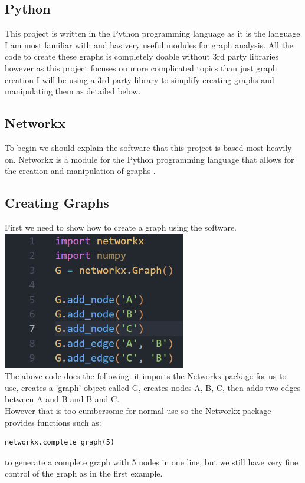 \documentclass{article}
\begin{document}
        \subsection{Python}
        This project is written in the Python programming language as it is the language I am most familiar with and has very useful modules for graph analysis. All the code to create these graphs is completely doable without 3rd party libraries however as this project focuses on more complicated topics than just graph creation I will be using a 3rd party library to simplify creating graphs and manipulating them as detailed below.
        \subsection{Networkx}
        To begin we should explain the software that this project is based most heavily on. Networkx is a module for the Python programming language that allows for the creation and manipulation of graphs \parencite{SciPyProceedings_11}.
        \subsection{Creating Graphs}
        First we need to show how to create a graph using the software.\\
        \includegraphics[width=8cm]{images/add_nodes_add_edges.png}\\
        The above code does the following: it imports the Networkx package for us to use, creates a 'graph' object called G, creates nodes A, B, C, then adds two edges between A and B and B and C.\\
        However that is too cumbersome for normal use so the Networkx package provides functions such as:
        \begin{verbatim}networkx.complete_graph(5)\end{verbatim}
        to generate a complete graph with 5 nodes in one line, but we still have very fine control of the graph as in the first example.
\end{document}
